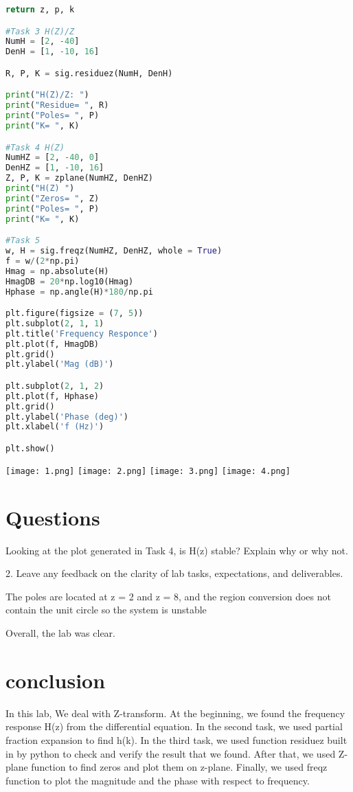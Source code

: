 \documentclass[12pt]{report}
\begin{document}
\begin{lstlisting}[language=Python]
    return z, p, k

#Task 3 H(Z)/Z
NumH = [2, -40]
DenH = [1, -10, 16]

R, P, K = sig.residuez(NumH, DenH)

print("H(Z)/Z: ")
print("Residue= ", R)
print("Poles= ", P)
print("K= ", K)

#Task 4 H(Z)
NumHZ = [2, -40, 0]
DenHZ = [1, -10, 16]
Z, P, K = zplane(NumHZ, DenHZ)
print("H(Z) ")
print("Zeros= ", Z)
print("Poles= ", P)
print("K= ", K)

#Task 5
w, H = sig.freqz(NumHZ, DenHZ, whole = True)
f = w/(2*np.pi)
Hmag = np.absolute(H)
HmagDB = 20*np.log10(Hmag)
Hphase = np.angle(H)*180/np.pi

plt.figure(figsize = (7, 5))
plt.subplot(2, 1, 1)
plt.title('Frequency Responce')
plt.plot(f, HmagDB)
plt.grid()
plt.ylabel('Mag (dB)')

plt.subplot(2, 1, 2)
plt.plot(f, Hphase)
plt.grid()
plt.ylabel('Phase (deg)')
plt.xlabel('f (Hz)')

plt.show()

\end{lstlisting}

\texttt{[image: 1.png]} 
\texttt{[image: 2.png]} 
\texttt{[image: 3.png]} 
\texttt{[image: 4.png]} 









\section{Questions}

Looking at the plot generated in Task 4, is H(z) stable? Explain why or why not.

2. Leave any feedback on the clarity of lab tasks, expectations, and deliverables.


The poles are located at z = 2 and z = 8, and the region conversion does not contain the unit circle so the system is unstable


Overall, the lab was clear.



\section{conclusion}

In this lab, We deal with Z-transform. At the beginning, we found the frequency response H(z) from the differential equation. In the second task, we used partial fraction expansion to find h(k). In the third task, we used function residuez built in by python to check and verify the result that we found. After that, we used Z-plane function to find zeros and plot them on z-plane. Finally, we used freqz function to plot the magnitude and the phase with respect to frequency. 




\newpage
\end{document}
